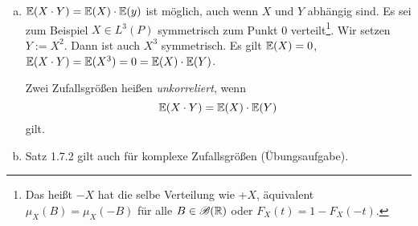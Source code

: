 \begin{rmrk}
  \begin{enumerate}[a)]
  \item $\mathbb{E}( X \cdot Y) = \mathbb{E}(X) \cdot \mathbb{E}(y)$ ist möglich, auch wenn $X$ und
    $Y$ abhängig sind. Es sei zum Beispiel $X \in L^3(P)$ symmetrisch zum
    Punkt 0 verteilt\footnote{%
      Das heißt $-X$ hat die selbe Verteilung wie $+X$, äquivalent $\mu_X(B) =
      \mu_X(-B)$ für alle $B \in \mathscr{B}(\mathbb{R})$ oder $F_X(t) = 1 -F_X(-t).$}.
    Wir setzen $Y := X^2$. Dann ist auch $X^3$ symmetrisch. Es gilt $\mathbb{E}(X) =
    0$, $\mathbb{E}(X \cdot Y ) = \mathbb{E}(X^3) = 0 = \mathbb{E}(X) \cdot \mathbb{E}(Y)$.

    Zwei Zufallsgrößen heißen \emph{unkorreliert}, wenn
    \[ \mathbb{E}( X \cdot Y ) = \mathbb{E}(X) \cdot \mathbb{E}(Y) \]
    gilt.
  \item Satz 1.7.2 gilt auch für komplexe Zufallsgrößen (Übungsaufgabe).
  \end{enumerate}
\end{rmrk}

